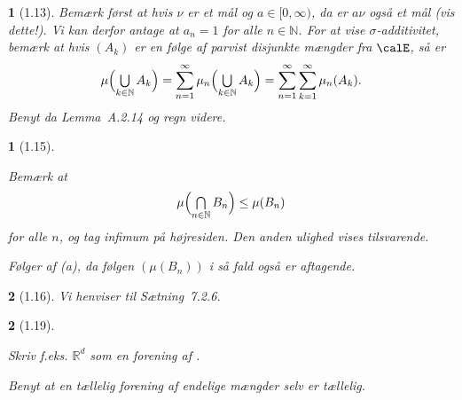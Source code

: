 \documentclass[a4paper, 11pt, article, danish, oneside]{memoir}
\newcommand{\naturals}{\mathbb{N}}
\newcommand{\reals}{\mathbb{R}}
\DeclareMathOperator*{\smallbigcup}{\textstyle\bigcup}
\DeclareMathOperator*{\bigunion}{\mathchoice
    {\smallbigcup}%
    {\bigcup}%
    {\bigcup}%
    {\bigcup}%
}
\DeclareMathOperator*{\smallbigcap}{\textstyle\bigcap}
\DeclareMathOperator*{\bigintersect}{\mathchoice
    {\smallbigcap}%
    {\bigcap}%
    {\bigcap}%
    {\bigcap}%
}
\newcommand{\pencilsymbol}{\raisebox{-2pt}{\normalfont\PencilLeft}}
\theoremstyle{changedotcustomnumber}
\newtheorem{opgave}{\pencilsymbol}
\theoremstyle{changedotbreakcustomnumber}
\newtheorem{opgavebreak}{\pencilsymbol}
\begin{document}
\begin{opgave}[1.13]
    Bemærk først at hvis $\nu$ er et mål og $a \in [0,\infty)$, da er $a \nu$ også et mål (vis dette!). Vi kan derfor antage at $a_n = 1$ for alle $n \in \naturals$. For at vise $\sigma$-additivitet, bemærk at hvis $(A_k)$ er en følge af parvist disjunkte mængder fra $\calE$, så er
    \begin{equation*}
        \mu \Bigl( \bigunion_{k \in \naturals} A_k \Bigr)
            = \sum_{n=1}^\infty \mu_n \Bigl( \bigunion_{k \in \naturals} A_k \Bigr)
            = \sum_{n=1}^\infty \sum_{k=1}^\infty \mu_n(A_k).
    \end{equation*}
    Benyt da Lemma~A.2.14 og regn videre.
\end{opgave}


\begin{opgavebreak}[1.15]
\begin{solutionsec}
    \item Bemærk at
    \begin{equation*}
        \mu \Bigl( \bigintersect_{n \in \naturals} B_n \Bigr)
            \leq \mu(B_n)
    \end{equation*}
    for alle $n$, og tag infimum på højresiden. Den anden ulighed vises tilsvarende.

    \item Følger af (a), da følgen $(\mu(B_n))$ i så fald også er aftagende.
\end{solutionsec}
\end{opgavebreak}


\begin{opgave}[1.16]
    Vi henviser til Sætning~7.2.6.
\end{opgave}


\begin{opgavebreak}[1.19]
\begin{solutionsec}
    \item Skriv f.eks. $\reals^d$ som en forening af .

    \item Benyt at en tællelig forening af endelige mængder selv er tællelig.
\end{solutionsec}
\end{opgavebreak}
\end{document}
